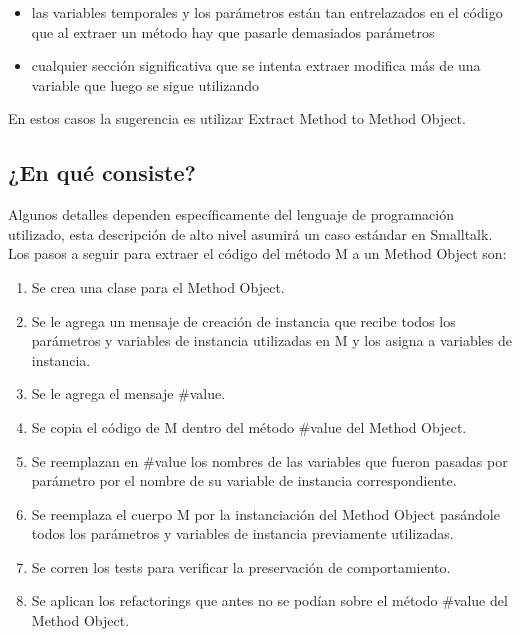 \begin{itemize}
    \item las variables temporales y los parámetros están tan entrelazados en el código que al extraer 
    un método hay que pasarle demasiados parámetros
    \item cualquier sección significativa que se intenta extraer modifica más de una variable que
    luego se sigue utilizando
\end{itemize}

En estos casos la sugerencia es utilizar Extract Method to Method Object.


\subsection{¿En qué consiste?}

Algunos detalles dependen específicamente del lenguaje de programación utilizado, esta descripción
de alto nivel asumirá un caso estándar en Smalltalk. Los pasos a seguir para extraer el código
del método M a un Method Object son:

\begin{enumerate}
    \item Se crea una clase para el Method Object.
    \item Se le agrega un mensaje de creación de instancia que recibe todos los parámetros y
    variables de instancia utilizadas en M y los asigna a variables de instancia.
    \item Se le agrega el mensaje \#value.
    \item Se copia el código de M dentro del método \#value del Method Object.
    \item Se reemplazan en \#value los nombres de las variables que fueron pasadas por parámetro
    por el nombre de su variable de instancia correspondiente.
    \item Se reemplaza el cuerpo M por la instanciación del Method Object pasándole todos los
    parámetros y variables de instancia previamente utilizadas.
    \item Se corren los tests para verificar la preservación de comportamiento.
    \item Se aplican los refactorings que antes no se podían sobre el método \#value del Method
    Object.
\end{enumerate}

